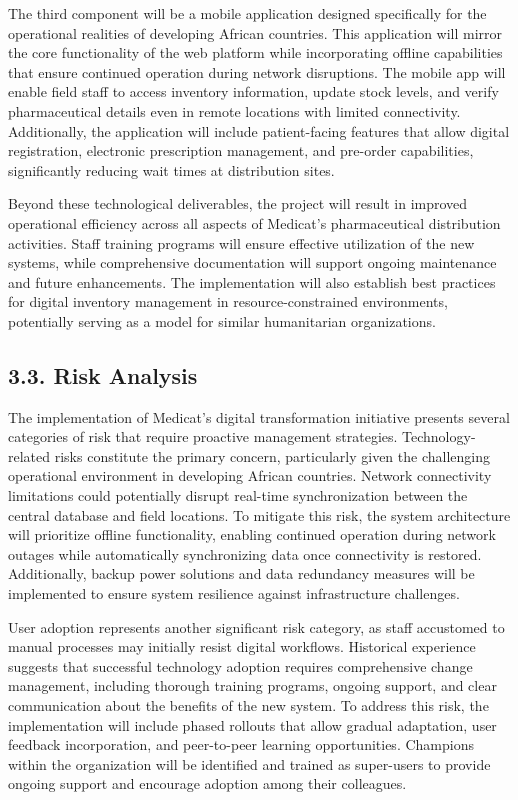 \documentclass[
]{report}
\begin{document}
The third component will be a mobile application designed specifically
for the operational realities of developing African countries. This
application will mirror the core functionality of the web platform while
incorporating offline capabilities that ensure continued operation
during network disruptions. The mobile app will enable field staff to
access inventory information, update stock levels, and verify
pharmaceutical details even in remote locations with limited
connectivity. Additionally, the application will include patient-facing
features that allow digital registration, electronic prescription
management, and pre-order capabilities, significantly reducing wait
times at distribution sites.

Beyond these technological deliverables, the project will result in
improved operational efficiency across all aspects of Medicat's
pharmaceutical distribution activities. Staff training programs will
ensure effective utilization of the new systems, while comprehensive
documentation will support ongoing maintenance and future enhancements.
The implementation will also establish best practices for digital
inventory management in resource-constrained environments, potentially
serving as a model for similar humanitarian organizations.

\subsection{3.3. Risk Analysis}\label{risk-analysis}

The implementation of Medicat's digital transformation initiative
presents several categories of risk that require proactive management
strategies. Technology-related risks constitute the primary concern,
particularly given the challenging operational environment in developing
African countries. Network connectivity limitations could potentially
disrupt real-time synchronization between the central database and field
locations. To mitigate this risk, the system architecture will
prioritize offline functionality, enabling continued operation during
network outages while automatically synchronizing data once connectivity
is restored. Additionally, backup power solutions and data redundancy
measures will be implemented to ensure system resilience against
infrastructure challenges.

User adoption represents another significant risk category, as staff
accustomed to manual processes may initially resist digital workflows.
Historical experience suggests that successful technology adoption
requires comprehensive change management, including thorough training
programs, ongoing support, and clear communication about the benefits of
the new system. To address this risk, the implementation will include
phased rollouts that allow gradual adaptation, user feedback
incorporation, and peer-to-peer learning opportunities. Champions within
the organization will be identified and trained as super-users to
provide ongoing support and encourage adoption among their colleagues.
\end{document}
